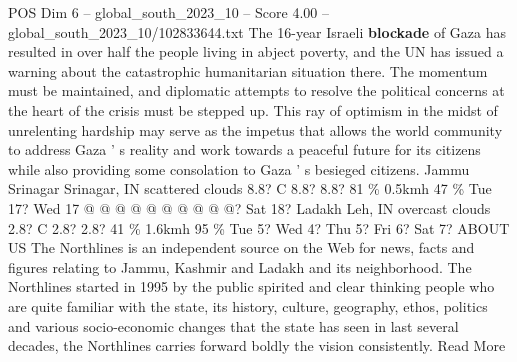 \begin{textsample}{POS Dim 6 – global\_south\_2023\_10 – Score 4.00 – global\_south\_2023\_10/102833644.txt}
The 16-year Israeli \textbf{blockade} of Gaza has resulted in over half the people living in abject poverty, and the UN has issued a warning about the catastrophic humanitarian situation there.
The momentum must be maintained, and diplomatic attempts to resolve the political concerns at the heart of the crisis must be stepped up.
This ray of optimism in the midst of unrelenting hardship may serve as the impetus that allows the world community to address Gaza ' s reality and work towards a peaceful future for its citizens while also providing some consolation to Gaza ' s besieged citizens.
Jammu Srinagar Srinagar, IN scattered clouds 8.8?
C 8.8? 8.8? 81 \% 0.5kmh 47 \% Tue 17?
Wed 17 @ @ @ @ @ @ @ @ @ @?
Sat 18?
Ladakh Leh, IN overcast clouds 2.8?
C 2.8? 2.8? 41 \% 1.6kmh 95 \% Tue 5?
Wed 4?
Thu 5?
Fri 6?
Sat 7?
ABOUT US The Northlines is an independent source on the Web for news, facts and figures relating to Jammu, Kashmir and Ladakh and its neighborhood.
The Northlines started in 1995 by the public spirited and clear thinking people who are quite familiar with the state, its history, culture, geography, ethos, politics and various socio-economic changes that the state has seen in last several decades, the Northlines carries forward boldly the vision consistently.
Read More

\end{textsample}
